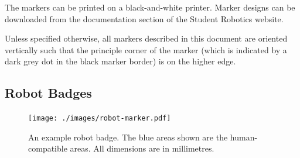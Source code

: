 The markers can be printed on a black-and-white printer.
Marker designs can be downloaded from the documentation section of the Student Robotics website.

Unless specified otherwise, all markers described in this document are oriented vertically such that the principle corner of the marker (which is indicated by a dark grey dot in the black marker border) is on the higher edge.

\subsection{Robot Badges}
\label{sub:robot-badges}

\begin{figure}
  \centering
  \texttt{[image: ./images/robot-marker.pdf]}
  \caption{An example robot badge.
           The blue areas shown are the human-compatible areas.
           All dimensions are in millimetres.}
  \label{fig:example-badge}
\end{figure}

